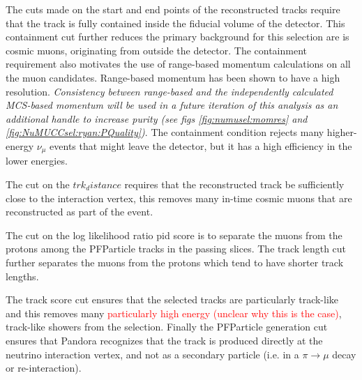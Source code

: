 \par \noindent The cuts made on the start and end points of the reconstructed tracks require that the track is fully contained inside the fiducial volume of the detector. This containment cut further reduces the primary background for this selection are is cosmic muons, originating from outside the detector. The containment requirement also motivates the use of range-based momentum calculations on all the muon candidates. Range-based momentum has been shown to have a high resolution. \emph{Consistency between range-based and the independently calculated MCS-based momentum will be used in a future iteration of this analysis as an additional handle to increase purity (see figs \ref{fig:numusel:momres} and \ref{fig:NuMUCCsel:ryan:PQuality})}. The containment condition rejects many higher-energy $\nu_{\mu}$ events that might leave the detector, but it has a high efficiency in the lower energies.

\par The cut on the $trk_distance$ requires that the reconstructed track be sufficiently close to the interaction vertex, this removes many in-time cosmic muons that are reconstructed as part of the event.

\par The cut on the log likelihood ratio pid score is to separate the muons from the protons among the PFParticle tracks in the passing slices. The track length cut further separates the muons from the protons which tend to have shorter track lengths. 

\par The track score cut ensures that the selected tracks are particularly track-like and this removes many \textcolor{red}{particularly high energy (unclear why this is the case)}, track-like showers from the selection. Finally the PFParticle generation cut ensures that Pandora recognizes that the track is produced directly at the neutrino interaction vertex, and not as a secondary particle (i.e. in a $\pi \rightarrow \mu$ decay or re-interaction). 

